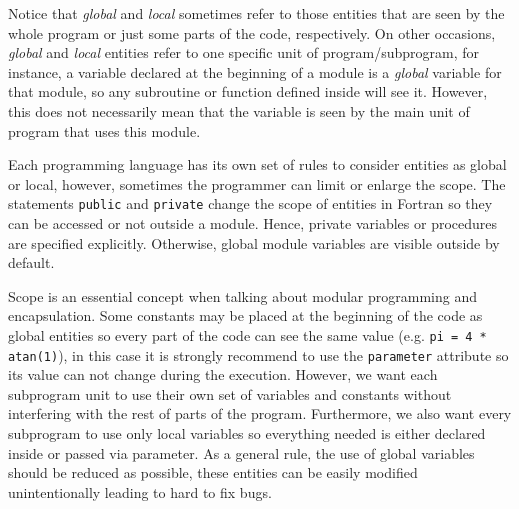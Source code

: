 Notice that \textit{global} and \textit{local} sometimes refer to those entities that are seen by the whole program or just some parts of the code, respectively. 
On other occasions, \textit{global} and \textit{local} entities refer to one specific unit of program/subprogram, for instance, a variable declared at the beginning of a module is a \textit{global} variable for that module, so any subroutine or function defined inside will see it. However, this does not necessarily mean that the variable is seen by the main unit of program that uses this module. 


Each programming language has its own set of rules to consider entities as global or local, however, sometimes the programmer can limit or enlarge the scope.
The statements \texttt{public} and \texttt{private} change the scope of entities in Fortran so they can be accessed or not outside a module.
Hence, private variables or procedures are specified explicitly. Otherwise, global module variables are visible outside by default.   

Scope is an essential concept when talking about modular programming and encapsulation. Some constants may be placed at the beginning of the code as global entities so every part of the code can see the same value (e.g. \texttt{pi = 4 * atan(1)}), in this case it is strongly recommend to use the \texttt{parameter} attribute so its value can not change during the execution. However, we want each subprogram unit to use their own set of variables and constants without interfering with the rest of parts of the program. Furthermore, we also want every subprogram to use only local variables so everything needed is either declared inside or passed via parameter. 
As a general rule, the use of global variables should be reduced as possible, these entities can be easily modified unintentionally leading to hard to fix bugs.  



